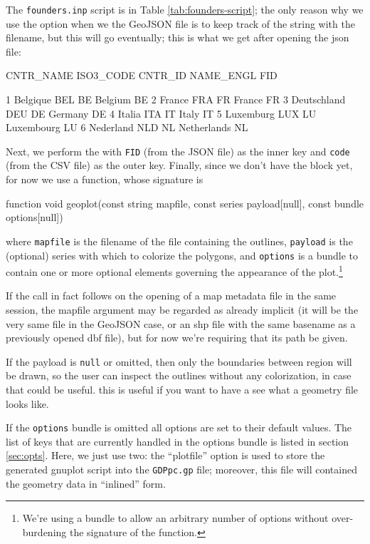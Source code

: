 \documentclass{article}
\begin{document}
The \texttt{founders.inp} script is in Table
\ref{tab:founders-script}; the only reason why we use the
 option when we  the GeoJSON file is to
keep track of the string with the filename, but this will go
eventually; this is what we get after opening the json file:
\begin{code}
     CNTR_NAME    ISO3_CODE      CNTR_ID    NAME_ENGL          FID

1     Belgique          BEL           BE      Belgium           BE
2       France          FRA           FR       France           FR
3  Deutschland          DEU           DE      Germany           DE
4       Italia          ITA           IT        Italy           IT
5    Luxemburg          LUX           LU   Luxembourg           LU
6    Nederland          NLD           NL  Netherlands           NL
\end{code}

Next, we perform the  with \texttt{FID} (from the JSON file)
as the inner key and \texttt{code} (from the CSV file) as the outer
key. Finally, since we don't have the  block yet, for now
we use a  function, whose signature is
\begin{code}
function void geoplot(const string mapfile,
	const series payload[null],
	const bundle options[null])
\end{code}
where \texttt{mapfile} is the filename of the file containing the
outlines, \texttt{payload} is the (optional) series with which to
colorize the polygons, and \texttt{options} is a bundle to contain one
or more optional elements governing the appearance of the
plot.\footnote{We're using a bundle to allow an arbitrary number of
  options without over-burdening the signature of the function.}

If the  call in fact follows on the opening of a map
metadata file in the same session, the mapfile argument may be
regarded as already implicit (it will be the very same file in the
GeoJSON case, or an shp file with the same basename as a previously
opened dbf file), but for now we're requiring that its path be
given.

If the payload is \texttt{null} or omitted, then only the
boundaries between region will be drawn, so the user can inspect the
outlines without any colorization, in case that could be useful.  this
is useful if you want to have a see what a geometry file looks like.

If the \texttt{options} bundle is omitted all options are set to their
default values. The list of keys that are currently handled in the
options bundle is listed in section \ref{sec:opts}. Here, we just use
two: the ``plotfile'' option is used to store the generated gnuplot
script into the \texttt{GDPpc.gp} file; moreover, this file will
contained the geometry data in ``inlined'' form.
\end{document}
